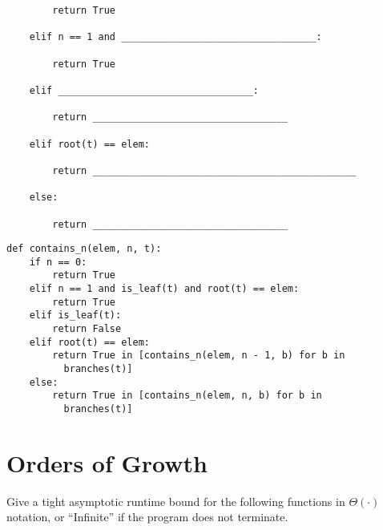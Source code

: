 \documentclass{exam}
\begin{document}
\begin{questions}
\begin{lstlisting}
        return True
        
    elif n == 1 and __________________________________:
    
        return True
        
    elif __________________________________:
    
        return __________________________________
        
    elif root(t) == elem:
    
        return ______________________________________________
        
    else:
    
        return __________________________________
\end{lstlisting}
\fi

\begin{solution}
\begin{lstlisting}
def contains_n(elem, n, t):
    if n == 0:
        return True
    elif n == 1 and is_leaf(t) and root(t) == elem:
        return True
    elif is_leaf(t):
        return False
    elif root(t) == elem:
        return True in [contains_n(elem, n - 1, b) for b in     
          branches(t)]
    else:
        return True in [contains_n(elem, n, b) for b in 
          branches(t)]
\end{lstlisting}
\end{solution}
\end{questions}

\clearpage

\section{Orders of Growth}

Give a tight asymptotic runtime bound for the following functions in $\Theta(\cdot)$ notation, or ``Infinite'' if the program does not terminate.
\end{document}
